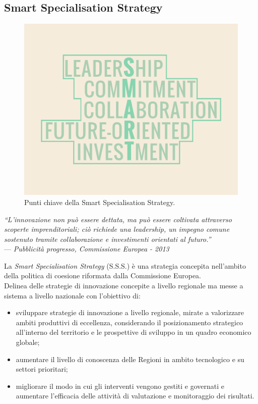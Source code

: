 \subsection{Smart Specialisation Strategy}
\begin{figure}[H]
	\begin{center}
	\includegraphics[scale=0.15]{immagini/SMART.png}
	\caption{Punti chiave della Smart Specialisation Strategy.}
	\end{center}
\end{figure}

\begin{flushright}{
	\slshape    
	``L'innovazione non può essere dettata, ma può essere coltivata attraverso scoperte imprenditoriali; ciò richiede una leadership, un impegno comune sostenuto tramite collaborazione e investimenti orientati al futuro.''} \\
	\medskip
    --- \textit{Pubblicità progresso, Commissione Europea - 2013}
\end{flushright}


\noindent La \textit{Smart Specialisation Strategy} (S.S.S.) è una strategia concepita nell'ambito della politica di coesione riformata dalla Commissione Europea.\\
Delinea delle strategie di innovazione concepite a livello regionale ma messe a sistema a livello nazionale con l'obiettivo di:
\begin{itemize}
\item sviluppare strategie di innovazione a livello regionale, mirate a valorizzare ambiti produttivi di eccellenza, considerando il posizionamento strategico all'interno del territorio e le prospettive di sviluppo in un quadro economico globale;
\item aumentare il livello di conoscenza delle Regioni in ambito tecnologico e su settori prioritari;
\item migliorare il modo in cui gli interventi vengono gestiti e governati e aumentare l'efficacia delle attività di valutazione e monitoraggio dei risultati.
\end{itemize}
\\
